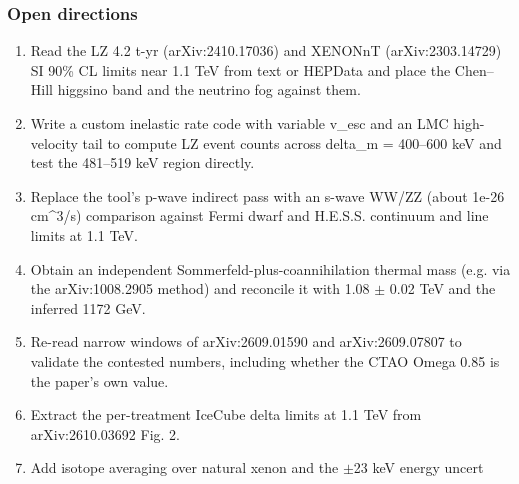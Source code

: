 \documentclass[11pt,a4paper]{article}
\begin{document}
\subsubsection*{Open directions}
\begin{enumerate}
  \item Read the LZ 4.2 t-yr (arXiv:2410.17036) and XENONnT (arXiv:2303.14729) SI 90\% CL limits near 1.1 TeV from text or HEPData and place the Chen--Hill higgsino band and the neutrino fog against them.
  \item Write a custom inelastic rate code with variable v\_esc and an LMC high-velocity tail to compute LZ event counts across delta\_m = 400--600 keV and test the 481--519 keV region directly.
  \item Replace the tool's p-wave indirect pass with an s-wave WW/ZZ (about 1e-26 cm\textasciicircum{}3/s) comparison against Fermi dwarf and H.E.S.S. continuum and line limits at 1.1 TeV.
  \item Obtain an independent Sommerfeld-plus-coannihilation thermal mass (e.g. via the arXiv:1008.2905 method) and reconcile it with 1.08 $\pm$ 0.02 TeV and the inferred 1172 GeV.
  \item Re-read narrow windows of arXiv:2609.01590 and arXiv:2609.07807 to validate the contested numbers, including whether the CTAO Omega 0.85 is the paper's own value.
  \item Extract the per-treatment IceCube delta limits at 1.1 TeV from arXiv:2610.03692 Fig. 2.
  \item Add isotope averaging over natural xenon and the $\pm$23 keV energy uncert
\end{enumerate}
\end{document}
